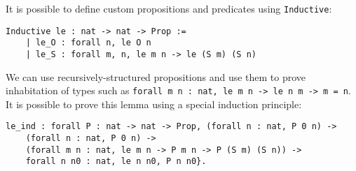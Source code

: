 It is possible to define custom propositions and predicates using \lstinline{Inductive}:
\begin{lstlisting}
Inductive le : nat -> nat -> Prop :=
	| le_O : forall n, le O n
	| le_S : forall m, n, le m n -> le (S m) (S n) 
\end{lstlisting}

We can use recursively-structured propositions and use them to prove inhabitation of types such as
\lstinline{forall m n : nat, le m n -> le n m -> m = n}. It is possible to prove this lemma using 
a special induction principle: 

\begin{lstlisting}
le_ind : forall P : nat -> nat -> Prop, (forall n : nat, P 0 n) -> 
	(forall n : nat, P 0 n) -> 
	(forall m n : nat, le m n -> P m n -> P (S m) (S n)) -> 
	forall n n0 : nat, le n n0, P n n0}.
\end{lstlisting}
